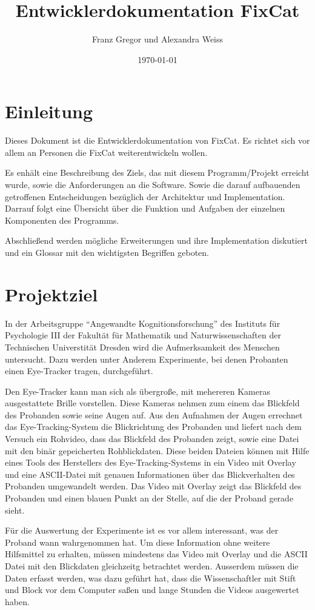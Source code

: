 \documentclass[a4paper,draft]{scrartcl}
\title{Entwicklerdokumentation FixCat}
\author{Franz Gregor und Alexandra Weiss}
\date{\today}
\begin{document}
\maketitle
\newpage
\tableofcontents
\newpage
\section{Einleitung}
Dieses Dokument ist die Entwicklerdokumentation von FixCat.
Es richtet sich vor allem an Personen die FixCat weiterentwickeln wollen.

Es enh\"alt eine Beschreibung des Ziels, das mit diesem Programm/Projekt erreicht wurde, sowie die Anforderungen an die Software.
Sowie die darauf aufbauenden getroffenen Entscheidungen bezüglich der Architektur und Implementation.
Darrauf folgt eine \"Ubersicht \"uber die Funktion und Aufgaben der einzelnen Komponenten des Programms.

Abschlie\ss end werden m\"ogliche Erweiterungen und ihre Implementation diskutiert und ein Glossar mit den wichtigsten Begriffen geboten.

\section{Projektziel}
In der Arbeitsgruppe "`Angewandte Kognitionsforschung"' des Instituts f\"ur Psychologie III der Fakult\"at f\"ur Mathematik und Naturwissenschaften der Technischen Universtit\"at Dresden wird die Aufmerksamkeit des Menschen untersucht.
Dazu werden unter Anderem Experimente, bei denen Probanten einen Eye-Tracker tragen, durchgef\"uhrt.

Den Eye-Tracker kann man sich als \"ubergroße, mit mehereren Kameras ausgestattete Brille vorstellen.
Diese Kameras nehmen zum einem das Blickfeld des Probanden sowie seine Augen auf.
Aus den Aufnahmen der Augen errechnet das Eye-Tracking-System die Blickrichtung des Probanden und liefert nach dem Versuch ein Rohvideo, dass das Blickfeld des Probanden zeigt, sowie eine Datei mit den bin\"ar gepeicherten Rohblickdaten.
Diese beiden Dateien k\"onnen mit Hilfe eines Tools des Herstellers des Eye-Tracking-Systems in ein Video mit Overlay und eine ASCII-Datei mit genauen Informationen \"uber das Blickverhalten des Probanden umgewandelt werden.
Das Video mit Overlay zeigt das Blickfeld des Probanden und einen blauen Punkt an der Stelle, auf die der Proband gerade sieht.

F\"ur die Auswertung der Experimente ist es vor allem interessant, was der Proband wann wahrgenommen hat.
Um diese Information ohne weitere Hilfsmittel zu erhalten, m\"ussen mindestens das Video mit Overlay und die ASCII Datei mit den Blickdaten gleichzeitg betrachtet werden.
Ausserdem m\"ussen die Daten erfasst werden, was dazu gef\"uhrt hat, dass die Wissenschaftler mit Stift und Block vor dem Computer sa\ss en und lange Stunden die Videos ausgewertet haben.
\end{document}
